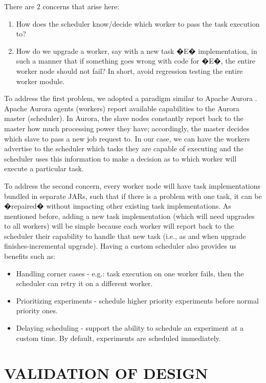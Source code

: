 \documentclass[sigconf]{acmart}
\begin{document}
There are 2 concerns that arise here:

\begin{enumerate}
\item How does the scheduler know/decide which worker to pass the task execution to?
\item How do we upgrade a worker, say with a new task �E� implementation, in such a manner that if something goes wrong with code for �E�, the entire worker node should not fail? In short, avoid regression testing the entire worker module.
\end{enumerate}

To address the first problem, we adopted a paradigm similar to Apache Aurora \cite{apacheAurora}.  Apache Aurora agents (workers) report available capabilities to the Aurora master (scheduler). In Aurora, the slave nodes constantly report back to the master how much processing power they have; accordingly, the master decides which slave to pass a new job request to. In our case, we can have the workers advertise to the scheduler which tasks they are capable of executing and the scheduler uses this information to make a decision as to which worker will execute a particular task.

To address the second concern, every worker node will have task implementations bundled in separate JARs, such that if there is a problem with one task, it can be �repaired� without impacting other existing task implementations. As mentioned before, adding a new task implementation (which will need upgrades to all workers) will be simple because each worker will report back to the scheduler their capability to handle that new task (i.e., as and when upgrade finishes-incremental upgrade). Having a custom scheduler also provides us benefits such as:

\begin{itemize}
\item Handling corner cases - e.g.: task execution on one worker fails, then the scheduler can retry it on a different worker.
\item Prioritizing experiments - schedule higher priority experiments before normal priority ones.
\item Delaying scheduling - support the ability to schedule an experiment at a custom time. By default, experiments are scheduled immediately.
\end{itemize}

\section{VALIDATION OF DESIGN}
\end{document}
